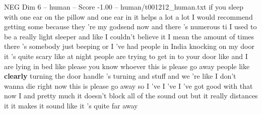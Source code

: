 \begin{textsample}{NEG Dim 6 – human – Score -1.00 – human/t001212\_human.txt}  \label{ex:f6_neg_039}
if you sleep with one ear on the pillow and one ear in it helps a lot a lot I would recommend getting some because they 're my godsend now and there 's numerous ti I used to be a really light sleeper and like I couldn't believe it I mean the amount of times there 's somebody just beeping or I 've had people in India knocking on my door it 's quite scary like at night people are trying to get in to your door like and I are lying in bed like please you know whoever this is please go away people like \textbf{clearly} turning the door handle 's turning and stuff and we 're like I don't wanna die right now this is please go away so I 've I 've I 've got good with that now I and pretty much it doesn't block all of the sound out but it really distances it it makes it sound like it 's quite far away

\end{textsample}
